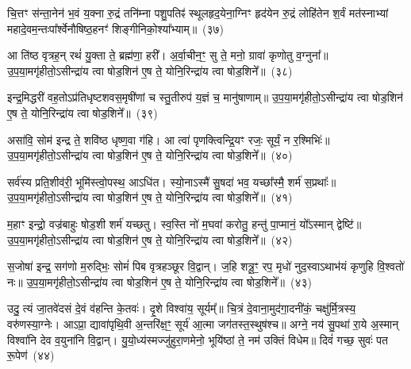 {\anuvakamend[{प्र॒या॒साय॒ चतु॑र्विꣳशतिः}]}%

चि॒त्तꣳ स॑न्ता॒नेन॑ भ॒वं य॒क्ना रु॒द्रं तनि॑म्ना पशु॒पतिꣴ॑ स्थूलहृद॒येना॒ग्निꣳ हृद॑येन रु॒द्रं लोहि॑तेन श॒र्वं मत॑स्नाभ्यां महादे॒व\-म॒न्तःपा᳚र्श्वेनौषिष्ठ॒\-हनꣳ॑ शिङ्गीनिको॒श्या᳚भ्याम्॥~(३७)

{\anuvakamend[{चि॒त्तम॒ष्टाद॑श}]}%

आ ति॑ष्ठ वृत्रह॒न् रथं॑ यु॒क्ता ते॒ ब्रह्म॑णा॒ हरी᳚। अ॒र्वा॒चीन॒ꣳ॒ सु ते॒ मनो॒ ग्रावा॑ कृणोतु व॒ग्नुना᳚॥ उ॒प॒या॒मगृ॑हीतो॒\-ऽसीन्द्रा॑य त्वा षोड॒शिन॑ ए॒ष ते॒ योनि॒रिन्द्रा॑य त्वा षोड॒शिने᳚॥~(३८)

{\anuvakamend[{आ ति॑ष्ठ॒ षड्विꣳ॑शतिः}]}%

इन्द्र॒मिद्धरी॑ वह॒तो\-ऽप्र॑तिधृष्टशवस॒मृषी॑णां च स्तु॒तीरुप॑ य॒ज्ञं च॒ मानु॑षाणाम्॥ उ॒प॒या॒मगृ॑हीतो॒\-ऽसीन्द्रा॑य त्वा षोड॒शिन॑ ए॒ष ते॒ योनि॒रिन्द्रा॑य त्वा षोड॒शिने᳚॥~(३९)

{\anuvakamend[{इन्द्र॒मित्त्रयो॑विꣳशतिः}]}%

असा॑वि॒ सोम॑ इन्द्र ते॒ शवि॑ष्ठ धृष्ण॒वा ग॑हि। आ त्वा॑ पृणक्त्विन्द्रि॒यꣳ रजः॒ सूर्यं॒ न र॒श्मिभिः॑॥ उ॒प॒या॒मगृ॑हीतो॒\-ऽसीन्द्रा॑य त्वा षोड॒शिन॑ ए॒ष ते॒ योनि॒रिन्द्रा॑य त्वा षोड॒शिने᳚॥~(४०)

{\anuvakamend[{असा॑वि स॒प्तविꣳ॑शतिः}]}%

सर्व॑स्य प्रति॒शीव॑री॒ भूमि॑स्त्वो॒पस्थ॒ आ\-ऽधि॑त। स्यो॒नाऽस्मै॑ सु॒षदा॑ भव॒ यच्छा᳚स्मै॒ शर्म॑ स॒प्रथाः᳚॥ उ॒प॒या॒मगृ॑हीतो॒\-ऽसीन्द्रा॑य त्वा षोड॒शिन॑ ए॒ष ते॒ योनि॒रिन्द्रा॑य त्वा षोड॒शिने᳚॥~(४१)

{\anuvakamend[{सर्व॑स्य॒ षड्विꣳ॑शतिः}]}%

म॒हाꣳ इन्द्रो॒ वज्र॑बाहुः षोड॒शी शर्म॑ यच्छतु। स्व॒स्ति नो॑ म॒घवा॑ करोतु॒ हन्तु॑ पा॒प्मानं॒ यो᳚\-ऽस्मान् द्वेष्टि॑॥ उ॒प॒या॒मगृ॑हीतो॒\-ऽसीन्द्रा॑य त्वा षोड॒शिन॑ ए॒ष ते॒ योनि॒रिन्द्रा॑य त्वा षोड॒शिने᳚॥~(४२)

{\anuvakamend[{सर्व॑स्य म॒हान्थ्षड्विꣳ॑शतिः॒ षड्विꣳ॑शतिः}]}%

स॒जोषा॑ इन्द्र॒ सग॑णो म॒रुद्भिः॒ सोमं॑ पिब वृत्रहञ्छूर वि॒द्वान्। ज॒हि शत्रू॒ꣳ॒ रप॒ मृधो॑ नुद॒स्वा\-ऽथाभ॑यं कृणुहि वि॒श्वतो॑ नः॥ उ॒प॒या॒मगृ॑हीतो॒\-ऽसीन्द्रा॑य त्वा षोड॒शिन॑ ए॒ष ते॒ योनि॒रिन्द्रा॑य त्वा षोड॒शिने᳚॥~(४३)

{\anuvakamend[{स॒जोषा᳚स्त्रि॒ꣳ॒शत्}]}%

उदु॒ त्यं जा॒तवे॑दसं दे॒वं व॑हन्ति के॒तवः॑। दृ॒शे विश्वा॑य॒ सूर्यम्᳚॥ चि॒त्रं दे॒वाना॒मुद॑गा॒दनी॑कं॒ चक्षु॑र्मि॒त्रस्य॒ वरु॑णस्या॒ग्नेः। आ\-ऽप्रा॒ द्यावा॑पृथि॒वी अ॒न्तरि॑क्ष॒ꣳ॒ सूर्य॑ आ॒त्मा जग॑तस्त॒स्थुष॑श्च॥ अग्ने॒ नय॑ सु॒पथा॑ रा॒ये अ॒स्मान् विश्वा॑नि देव व॒युना॑नि वि॒द्वान्। यु॒यो॒ध्य॑स्मज्जु॑हुरा॒णमेनो॒ भूयि॑ष्ठां ते॒ नम॑ उक्तिं विधेम॥ दिवं॑ गच्छ॒ सुवः॑ पत रू॒पेण॑~(४४)

